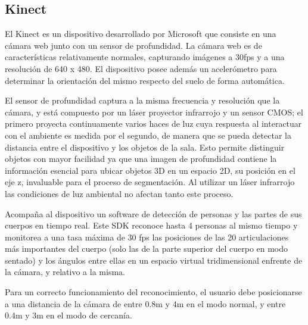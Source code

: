 
\subsection{Kinect}

El Kinect es un dispositivo desarrollado por Microsoft que consiste en una cámara web junto con un sensor de profundidad. La cámara web es de características relativamente normales, capturando imágenes a 30fps y a una resolución de 640 x 480. El dispositivo posee además un acelerómetro para determinar la orientación del mismo respecto del suelo de forma automática.


El sensor de profundidad captura a la misma frecuencia y resolución que la cámara, y está compuesto por un láser proyector infrarrojo y un sensor CMOS; el primero proyecta continuamente varios haces de luz cuya respuesta al interactuar con el ambiente es medida por el segundo, de manera que se pueda detectar la distancia entre el dispositivo y los objetos de la sala. Esto permite distinguir objetos con mayor facilidad ya que una imagen de profundidad contiene la información esencial para ubicar objetos 3D en un espacio 2D, su posición en el eje z, invaluable para el proceso de segmentación. Al utilizar un láser infrarrojo las condiciones de luz ambiental no afectan tanto este proceso. 



Acompaña al dispositivo un software de detección de personas y las partes de sus cuerpos en tiempo real. Este SDK reconoce hasta 4 personas al mismo tiempo y monitorea a una tasa máxima de 30 fps las posiciones de las 20 articulaciones más importantes del cuerpo (solo las de la parte superior del cuerpo en modo sentado) y los ángulos entre ellas en un espacio virtual tridimensional enfrente de la cámara, y relativo a la misma.




Para un correcto funcionamiento del reconocimiento, el usuario debe posicionarse a una distancia de la cámara de entre 0.8m y 4m en el modo normal, y entre 0.4m y 3m en el modo de cercanía. 


